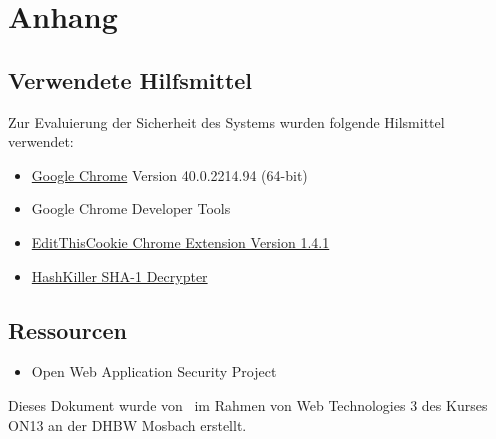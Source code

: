 \chapter{Anhang}
\section{Verwendete Hilfsmittel}
Zur Evaluierung der Sicherheit des Systems wurden folgende Hilsmittel verwendet:

\begin{itemize}
\item \href{http://www.google.com/chrome/}{Google Chrome} \scriptsize Version 40.0.2214.94 (64-bit) \normalsize
\item Google Chrome Developer Tools
\item \href{http://www.editthiscookie.com/}{EditThisCookie Chrome Extension \scriptsize Version 1.4.1 \normalsize}
\item \href{http://www.hashkiller.co.uk/sha1-decrypter.aspx}{HashKiller SHA-1 Decrypter}
\end{itemize}

\section{Ressourcen}
\begin{itemize}
\item Open Web Application Security Project
\end{itemize}


\clearpage
\BgThispage
\thispagestyle{empty}
\vspace*{\fill}
\begin{center}
Dieses Dokument wurde von \authors\ im Rahmen von Web Technologies 3 des Kurses ON13 an der DHBW Mosbach erstellt.
\end{center}
\vspace*{\fill}